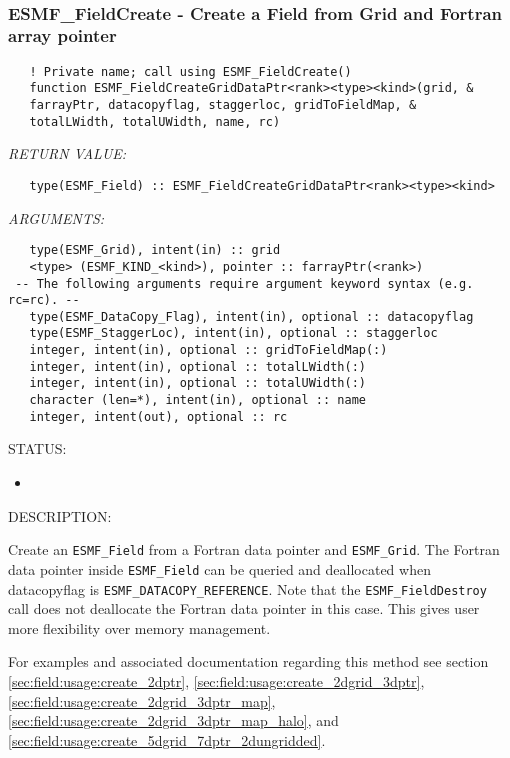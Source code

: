  
\mbox{}\hrulefill\ 
 
\subsubsection [ESMF\_FieldCreate] {ESMF\_FieldCreate - Create a Field from Grid and Fortran array pointer }


   
\begin{verbatim}   ! Private name; call using ESMF_FieldCreate() 
   function ESMF_FieldCreateGridDataPtr<rank><type><kind>(grid, & 
   farrayPtr, datacopyflag, staggerloc, gridToFieldMap, & 
   totalLWidth, totalUWidth, name, rc) 
   \end{verbatim}{\em RETURN VALUE:}
\begin{verbatim}   type(ESMF_Field) :: ESMF_FieldCreateGridDataPtr<rank><type><kind> 
   \end{verbatim}{\em ARGUMENTS:}
\begin{verbatim}   type(ESMF_Grid), intent(in) :: grid 
   <type> (ESMF_KIND_<kind>), pointer :: farrayPtr(<rank>) 
 -- The following arguments require argument keyword syntax (e.g. rc=rc). --
   type(ESMF_DataCopy_Flag), intent(in), optional :: datacopyflag 
   type(ESMF_StaggerLoc), intent(in), optional :: staggerloc 
   integer, intent(in), optional :: gridToFieldMap(:) 
   integer, intent(in), optional :: totalLWidth(:) 
   integer, intent(in), optional :: totalUWidth(:) 
   character (len=*), intent(in), optional :: name 
   integer, intent(out), optional :: rc 
   \end{verbatim}
{\sf STATUS:}
   \begin{itemize} 
   \item{} 
   \end{itemize} 
   
{\sf DESCRIPTION:\\ }

 
   Create an {\tt ESMF\_Field} from a Fortran data pointer and {\tt ESMF\_Grid}. 
   The Fortran data pointer inside {\tt ESMF\_Field} can be queried and deallocated when 
   datacopyflag is {\tt ESMF\_DATACOPY\_REFERENCE}. Note that the {\tt ESMF\_FieldDestroy} call does not 
   deallocate the Fortran data pointer in this case. This gives user more flexibility over memory management. 
   
   For examples and 
   associated documentation regarding this method see section 
   \ref{sec:field:usage:create_2dptr}, 
   \ref{sec:field:usage:create_2dgrid_3dptr}, 
   \ref{sec:field:usage:create_2dgrid_3dptr_map}, 
   \ref{sec:field:usage:create_2dgrid_3dptr_map_halo}, and 
   \ref{sec:field:usage:create_5dgrid_7dptr_2dungridded}. 
   
